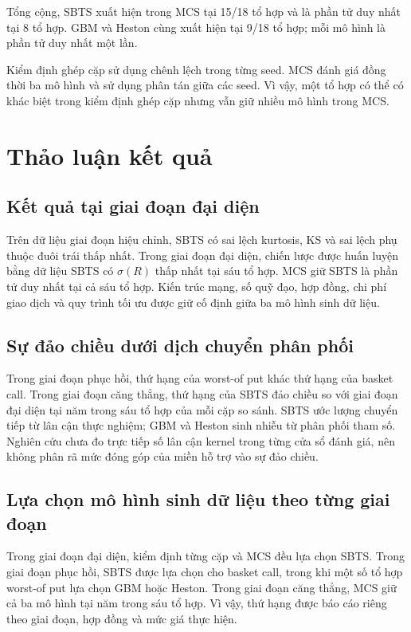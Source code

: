 Tổng cộng, SBTS xuất hiện trong MCS tại 15/18 tổ hợp và là phần tử duy nhất tại
8 tổ hợp. GBM và Heston cùng xuất hiện tại 9/18 tổ hợp; mỗi mô hình là phần tử
duy nhất một lần.

Kiểm định ghép cặp sử dụng chênh lệch trong từng seed. MCS đánh giá đồng thời
ba mô hình và sử dụng phân tán giữa các seed. Vì vậy, một tổ hợp có thể có
khác biệt trong kiểm định ghép cặp nhưng vẫn giữ nhiều mô hình trong MCS.

\section{Thảo luận kết quả}
\label{sec:c4-discussion}

\subsection{Kết quả tại giai đoạn đại diện}

Trên dữ liệu giai đoạn hiệu chỉnh, SBTS có sai lệch kurtosis, KS và sai lệch
phụ thuộc đuôi trái thấp nhất. Trong giai đoạn đại diện, chiến lược được huấn luyện bằng dữ liệu SBTS có $\sigma(R)$ thấp
nhất tại sáu tổ hợp. MCS giữ SBTS là phần tử duy nhất tại cả sáu tổ hợp. Kiến
trúc mạng, số quỹ đạo, hợp đồng, chi phí giao dịch và quy trình tối ưu được giữ
cố định giữa ba mô hình sinh dữ liệu.

\subsection{Sự đảo chiều dưới dịch chuyển phân phối}

Trong giai đoạn phục hồi, thứ hạng của worst-of put khác thứ hạng của basket call.
Trong giai đoạn căng thẳng, thứ hạng của SBTS đảo chiều so với giai đoạn đại diện tại năm trong sáu tổ hợp
của mỗi cặp so sánh. SBTS ước lượng chuyển tiếp từ lân cận thực nghiệm; GBM và
Heston sinh nhiễu từ phân phối tham số. Nghiên cứu chưa đo trực tiếp số lân cận
kernel trong từng cửa sổ đánh giá, nên không phân rã mức đóng góp của miền hỗ
trợ vào sự đảo chiều.

\subsection{Lựa chọn mô hình sinh dữ liệu theo từng giai đoạn}

Trong giai đoạn đại diện, kiểm định từng cặp và MCS đều lựa chọn SBTS. Trong giai đoạn phục hồi,
SBTS được lựa chọn cho basket call, trong khi một số tổ hợp worst-of put lựa
chọn GBM hoặc Heston. Trong giai đoạn căng thẳng, MCS giữ cả ba mô hình tại năm trong sáu tổ
hợp. Vì vậy, thứ hạng được báo cáo riêng theo giai đoạn, hợp đồng và mức giá
thực hiện.

